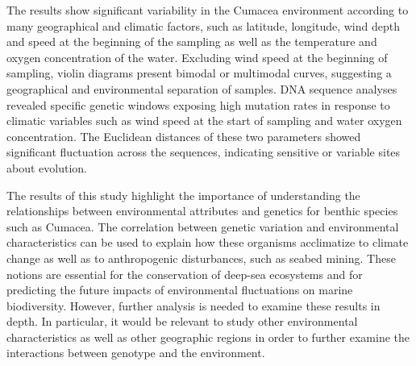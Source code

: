 The results show significant variability in the Cumacea environment according to many geographical and climatic factors, such as latitude, longitude, wind depth and speed at the beginning of the sampling as well as the temperature and oxygen concentration of the water. Excluding wind speed at the beginning of sampling, violin diagrams present bimodal or multimodal curves, suggesting a geographical and environmental separation of samples. DNA sequence analyses revealed specific genetic windows exposing high mutation rates in response to climatic variables such as wind speed at the start of sampling and water oxygen concentration. The Euclidean distances of these two parameters showed significant fluctuation across the sequences, indicating sensitive or variable sites about evolution.

The results of this study highlight the importance of understanding the relationships between environmental attributes and genetics for benthic species such as Cumacea. The correlation between genetic variation and environmental characteristics can be used to explain how these organisms acclimatize to climate change as well as to anthropogenic disturbances, such as seabed mining. These notions are essential for the conservation of deep-sea ecosystems and for predicting the future impacts of environmental fluctuations on marine biodiversity. However, further analysis is needed to examine these results in depth. In particular, it would be relevant to study other environmental characteristics as well as other geographic regions in order to further examine the interactions between genotype and the environment.

